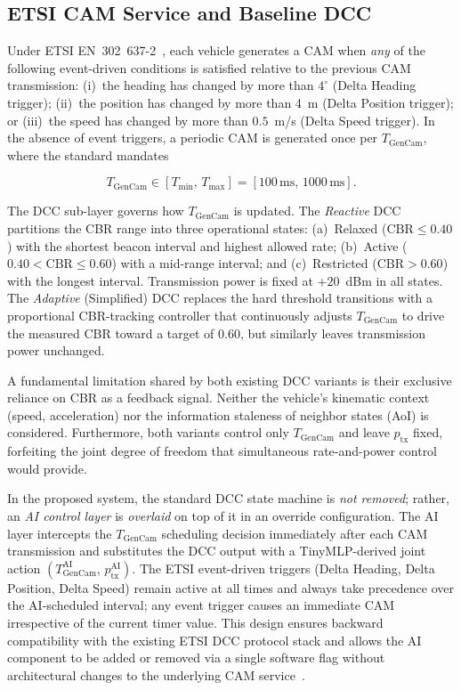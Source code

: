 \documentclass[journal]{IEEEtran}
\begin{document}
\subsection{ETSI CAM Service and Baseline DCC}
\label{subsec:cam_dcc}

Under ETSI EN~302~637-2~\cite{Bhattacharyya2024}, each vehicle
generates a CAM when \emph{any} of the following event-driven
conditions is satisfied relative to the previous CAM transmission:
(i)~the heading has changed by more than $4^{\circ}$ (Delta Heading
trigger); (ii)~the position has changed by more than 4~m (Delta
Position trigger); or (iii)~the speed has changed by more than
$0.5$~m/s (Delta Speed trigger).  In the absence of event triggers,
a periodic CAM is generated once per $T_{\text{GenCam}}$, where the
standard mandates

\begin{equation}
  T_{\text{GenCam}} \in [T_{\min},\, T_{\max}] = [100\,\text{ms},\, 1000\,\text{ms}].
  \label{eq:tgencam_bounds}
\end{equation}

The DCC sub-layer governs how $T_{\text{GenCam}}$ is updated.  The
\emph{Reactive} DCC~\cite{Bhattacharyya2024} partitions the CBR
range into three operational states: (a)~Relaxed ($\text{CBR} \le 0.40$)
with the shortest beacon interval and highest allowed rate;
(b)~Active ($0.40 < \text{CBR} \le 0.60$) with a mid-range interval;
and (c)~Restricted ($\text{CBR} > 0.60$) with the longest interval.
Transmission power is fixed at $+20$~dBm in all states.  The
\emph{Adaptive} (Simplified) DCC replaces the hard threshold
transitions with a proportional CBR-tracking controller that
continuously adjusts $T_{\text{GenCam}}$ to drive the measured CBR
toward a target of 0.60, but similarly leaves transmission power
unchanged.

A fundamental limitation shared by both existing DCC variants is
their exclusive reliance on CBR as a feedback signal.  Neither the
vehicle's kinematic context (speed, acceleration) nor the
information staleness of neighbor states (AoI) is considered.
Furthermore, both variants control only $T_{\text{GenCam}}$ and leave
$p_{\text{tx}}$ fixed, forfeiting the joint degree of freedom that
simultaneous rate-and-power control would provide.

In the proposed system, the standard DCC state machine is
\emph{not removed}; rather, an \emph{AI control layer} is
\emph{overlaid} on top of it in an override configuration.  The AI
layer intercepts the $T_{\text{GenCam}}$ scheduling decision
immediately after each CAM transmission and substitutes the DCC
output with a TinyMLP-derived joint action
$(T_{\text{GenCam}}^{\mathrm{AI}},\, p_{\text{tx}}^{\mathrm{AI}})$.
The ETSI event-driven triggers (Delta Heading, Delta Position,
Delta Speed) remain active at all times and always take precedence
over the AI-scheduled interval; any event trigger causes an
immediate CAM irrespective of the current timer value.  This design
ensures backward compatibility with the existing ETSI DCC
protocol stack and allows the AI component to be added or removed
via a single software flag without architectural changes to the
underlying CAM service~\cite{Mianji2025}.
\end{document}
